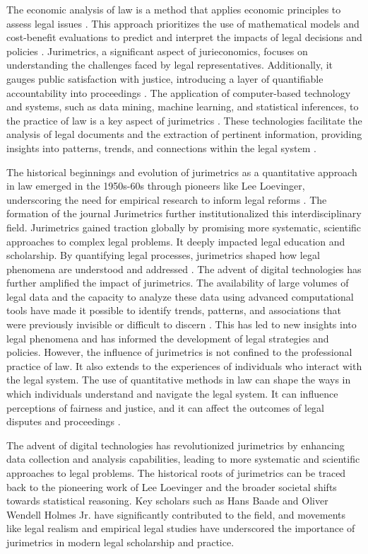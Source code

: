The economic analysis of law is a method that applies economic principles to assess legal issues \cite{loevinger1959}. This approach prioritizes the use of mathematical models and cost-benefit evaluations to predict and interpret the impacts of legal decisions and policies \cite{loevinger1959}. Jurimetrics, a significant aspect of jurieconomics, focuses on understanding the challenges faced by legal representatives. Additionally, it gauges public satisfaction with justice, introducing a layer of quantifiable accountability into proceedings \cite{loevinger1959}. The application of computer-based technology and systems, such as data mining, machine learning, and statistical inferences, to the practice of law is a key aspect of jurimetrics \cite{loevinger1959}. These technologies facilitate the analysis of legal documents and the extraction of pertinent information, providing insights into patterns, trends, and connections within the legal system \cite{loevinger1959}.

The historical beginnings and evolution of jurimetrics as a quantitative approach in law emerged in the 1950s-60s through pioneers like Lee Loevinger, underscoring the need for empirical research to inform legal reforms \cite{loevinger1959}. The formation of the journal Jurimetrics further institutionalized this interdisciplinary field. Jurimetrics gained traction globally by promising more systematic, scientific approaches to complex legal problems. It deeply impacted legal education and scholarship. By quantifying legal processes, jurimetrics shaped how legal phenomena are understood and addressed \cite{loevinger1959}. The advent of digital technologies has further amplified the impact of jurimetrics. The availability of large volumes of legal data and the capacity to analyze these data using advanced computational tools have made it possible to identify trends, patterns, and associations that were previously invisible or difficult to discern \cite{loevinger1959}. This has led to new insights into legal phenomena and has informed the development of legal strategies and policies. However, the influence of jurimetrics is not confined to the professional practice of law. It also extends to the experiences of individuals who interact with the legal system. The use of quantitative methods in law can shape the ways in which individuals understand and navigate the legal system. It can influence perceptions of fairness and justice, and it can affect the outcomes of legal disputes and proceedings \cite{loevinger1959}.

The advent of digital technologies has revolutionized jurimetrics by enhancing data collection and analysis capabilities, leading to more systematic and scientific approaches to legal problems. The historical roots of jurimetrics can be traced back to the pioneering work of Lee Loevinger and the broader societal shifts towards statistical reasoning. Key scholars such as Hans Baade and Oliver Wendell Holmes Jr. have significantly contributed to the field, and movements like legal realism and empirical legal studies have underscored the importance of jurimetrics in modern legal scholarship and practice.


